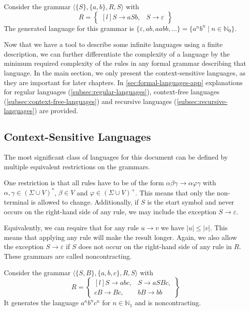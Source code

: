 \begin{exmp}
    Consider the grammar $\langle \{S\}, \{a, b\}, R, S \rangle$ with
    \[
        R = \begin{Bmatrix*}[l]
                S \to aSb,
                &S \to \varepsilon
        \end{Bmatrix*}
    \]
    The generated language for this grammar is $\{\varepsilon, ab, aabb, \dots\} = \{a^{n}b^{n} \mid n \in \mathbb{N}_0\}$.
\end{exmp}

Now that we have a tool to describe some infinite languages using a finite description, we can further differentiate the complexity of a language by the minimum required complexity of the rules in any formal grammar describing that language.
In the main section, we only present the context-sensitive languages, as they are important for later chapters.
In \cref{sec:formal-languages-app} explanations for regular languages (\cref{subsec:regular-languages}), context-free languages (\cref{subsec:context-free-languages}) and recursive languages (\cref{subsec:recursive-languages}) are provided.

\subsection{Context-Sensitive Languages}\label{subsec:context-sensitive-languages}

The most significant class of languages for this document can be defined by multiple equivalent restrictions on the grammars.

One restriction is that all rules have to be of the form $\alpha\beta\gamma \to \alpha\varphi\gamma$ with $\alpha, \gamma \in (\Sigma \cup V)^{*}$, $\beta \in V$ and $\varphi \in (\Sigma \cup V)^{+}$.
This means that only the non-terminal is allowed to change.
Additionally, if $S$ is the start symbol and never occurs on the right-hand side of any rule, we may include the exception $S \to \varepsilon$.

Equivalently, we can require that for any rule $u \to v$ we have $|u| \leq |v|$.
This means that applying any rule will make the result longer.
Again, we also allow the exception $S \to \varepsilon$ if $S$ does not occur on the right-hand side of any rule in $R$.
These grammars are called noncontracting.

\begin{exmp}
    Consider the grammar $\langle \{S, B\}, \{a, b, c\}, R, S \rangle$ with
    \[
        R = \begin{Bmatrix*}[l]
                S \to abc, &S \to aSBc, \\
                cB \to Bc, &bB \to bb
        \end{Bmatrix*}
    \]
    It generates the language $a^{n}b^{n}c^{n}$ for $n \in \mathbb{N}_{1}$ and is noncontracting.
\end{exmp}

